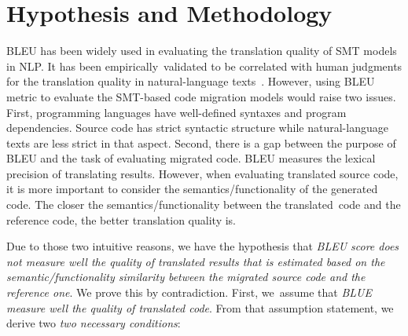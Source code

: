\section{Hypothesis and Methodology}


BLEU has been widely used in evaluating the translation quality of SMT
models in NLP. It has been empirically~validated to be correlated with
human judgments for the translation quality in natural-language
texts~\cite{Papineni2002}.
%
%
However, using BLEU metric to evaluate
the SMT-based code migration models would raise two issues. First,
programming languages
have well-defined syntaxes and program dependencies. Source code has
strict syntactic structure while natural-language texts are less
strict in that aspect.
%
%
Second, there is a gap between the purpose of BLEU and the task of
evaluating migrated code. BLEU measures the lexical precision of
translating results. However, when evaluating translated source code,
it is more important to consider the semantics/functionality of
the generated code.
%
The closer the semantics/functionality between the translated~code and
the reference code, the better translation quality is.
%

Due to those two intuitive reasons, we have the hypothesis that {\em
  BLEU score does not measure well the quality of translated results
  that is estimated based on the semantic/functionality similarity
  between the migrated source code and the reference one}. We prove
this by contradiction. First, we~assume that {\em BLUE
  measure well the quality of translated code}. From that assumption
statement, we derive two {\em two necessary conditions}:


